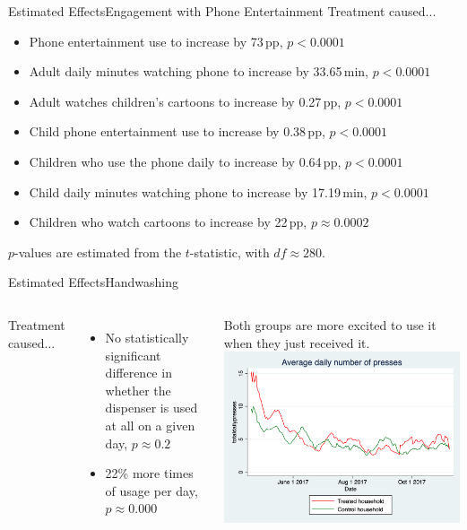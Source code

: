 \documentclass[aspectratio=169]{beamer}
\begin{document}
\begin{frame}{Estimated Effects}{Engagement with Phone Entertainment}
	Treatment caused...
	\begin{itemize}
		\item Phone entertainment use to increase by 73\,pp, $p < 0.0001$
		\item Adult daily minutes watching phone to increase by 33.65\,min, $p < 0.0001$
		\item Adult watches children's cartoons to increase by 0.27\,pp, $p < 0.0001$
		\item Child phone entertainment use to increase by 0.38\,pp, $p < 0.0001$
		\item Children who use the phone daily to increase by 0.64\,pp, $p < 0.0001$
		\item Child daily minutes watching phone to increase by 17.19\,min, $p < 0.0001$
		\item Children who watch cartoons to increase by 22\,pp, $p \approx 0.0002$
	\end{itemize}

	$p$-values are estimated from the $t$-statistic, with $df \approx 280$.
\end{frame}

\begin{frame}{Estimated Effects}{Handwashing}
	\begin{columns}
	Treatment caused...
	\begin{itemize}
		\item No statistically significant difference in whether the
			dispenser is used at all on a given day, $p \approx
			0.2$
		\item 22\% more times of usage per day, $p \approx 0.000$
	\end{itemize}
	Both groups are more excited to use it when they just received it.
	\includegraphics[width=\linewidth]{img-000.png}
	\end{columns}
\end{frame}
\end{document}
